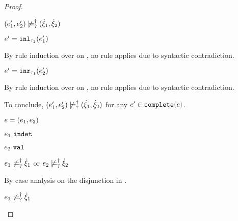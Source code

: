 \begin{proof}
\begin{byCases}
\begin{byCases}
\begin{byCases}
\begin{byCases}
\begin{byCases}
\begin{pfsteps*}
            \item $(e_1' , e_2') \not\models_{?}^{\dag} (\dot{\xi}_1 , \dot{\xi}_2)$ 
            \end{pfsteps*} 
          \end{byCases}
          \item[\text{(\ref{rule:VInl})}] 
          \begin{pfsteps*} 
          \item $e'=\mathtt{inl}_{\tau_2}({e_1'})$ 
          \end{pfsteps*}
          By rule induction over  on , no rule applies due to syntactic contradiction.
          \item[\text{(\ref{rule:VInr})}] 
          \begin{pfsteps*} 
          \item $e'=\mathtt{inr}_{\tau_1}({e_2'})$ 
          \end{pfsteps*}
          By rule induction over  on , no rule applies due to syntactic contradiction.
        \end{byCases}
        To conclude, $(e_1' , e_2') \not\models_{?}^{\dag} (\dot{\xi}_1 , \dot{\xi}_2)$ for any $e' \in \expcomplete{e}$.
      \end{byCases}
      \item[\text{(\ref{rule:IPairL})}] 
      \begin{pfsteps*}
      \item $e=(e_1 , e_2)$ 
      \item $e_1 ~\mathtt{indet}$  
      \item $e_2 ~\mathtt{val}$  
      \item $e_1 \not\models_{?}^{\dag} \dot{\xi}_1$ or $e_2 \not\models_{?}^{\dag} \dot{\xi}_2$  
      \end{pfsteps*}
      By case analysis on the disjunction in .
      \begin{byCases}
        \item[\cnotsatisfyormay{e_1}{\hxi_1}]
        \begin{pfsteps*}
        \item $e_1 \not\models_{?}^{\dag} \dot{\xi}_1$  

\end{pfsteps*}
\end{byCases}
\end{byCases}
\end{byCases}
\end{proof}
